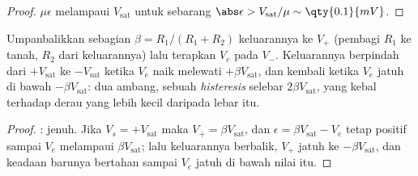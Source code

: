 \begin{proof}
$\mu\epsilon$ melampaui $V_{\mathrm{sat}}$ untuk sebarang $\abs\epsilon >
V_{\mathrm{sat}}/\mu \sim \qty{0.1}{mV}$.
\end{proof}

\begin{proposition}\label{prop:b1:operational-amplifier:schmitt}
Umpanbalikkan sebagian $\beta = R_1/(R_1 + R_2)$ keluarannya ke $V_+$
(pembagi $R_1$ ke tanah, $R_2$ dari keluarannya) lalu terapkan 
$V_e$ pada $V_-$. Keluarannya berpindah dari $+V_{\mathrm{sat}}$ ke
$-V_{\mathrm{sat}}$ ketika $V_e$ naik melewati $+\beta V_{\mathrm{sat}}$,
dan kembali ketika $V_e$ jatuh di bawah $-\beta V_{\mathrm{sat}}$: dua
ambang, sebuah \emph{histeresis} selebar $2\beta V_{\mathrm{sat}}$, yang
kebal terhadap derau yang lebih kecil daripada lebar itu.
\end{proposition}

\begin{proof}
: jenuh. Jika $V_s = +V_{\mathrm{sat}}$ maka $V_+ =
\beta V_{\mathrm{sat}}$, dan $\epsilon = \beta V_{\mathrm{sat}} - V_e$
tetap positif sampai $V_e$ melampaui $\beta V_{\mathrm{sat}}$; lalu
keluarannya berbalik, $V_+$ jatuh ke $-\beta V_{\mathrm{sat}}$, dan
keadaan barunya bertahan sampai $V_e$ jatuh di bawah nilai itu.
\end{proof}

